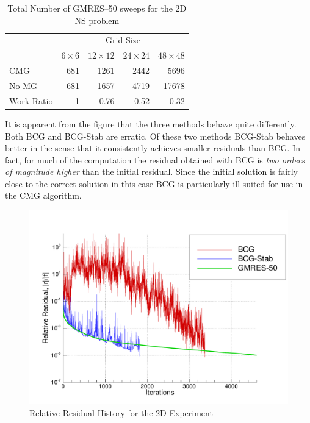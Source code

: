     \begin{table}[hbt]

        \begin{centering}
        
        \caption{Total Number of GMRES--50 sweeps for the 2D NS problem}
        \label{table:2D_3}
        \vspace{1ex}
        \begin{tabular}{|l|rrrr|} \hline
                    & \multicolumn{4}{c|}{Grid Size}                  \\
                    & $6\times 6$ & $12\times 12$ 
                    & $24\times 24$ & $48\times 48$ \\ \hline
        CMG         & 681   & 1261    & 2442    & 5696    \\ 
        No MG       & 681   & 1657    & 4719    & 17678   \\ \hline
        Work Ratio  & 1     & 0.76    & 0.52    & 0.32    \\ \hline    
        \end{tabular}

        \end{centering}

    \end{table}

    
It is apparent from the figure that the three methods behave quite differently.  Both BCG and BCG-Stab are erratic.  Of these two methods BCG-Stab behaves better in the sense that it consistently achieves smaller residuals than BCG.  In fact, for much of the computation the residual obtained with BCG is \emph{two orders of magnitude higher} than the initial residual.  Since the initial solution is fairly close to the correct solution in this case BCG is particularly ill-suited for use in the CMG algorithm.

\begin{figure}
  \begin{center}
    \includegraphics[width=.85\textwidth]{figures/cmg/history_bcg_bcgstab_gmres}
    \caption{Relative Residual History for the 2D Experiment}
    \label{fig:resid_hist}
  \end{center}
\end{figure}

